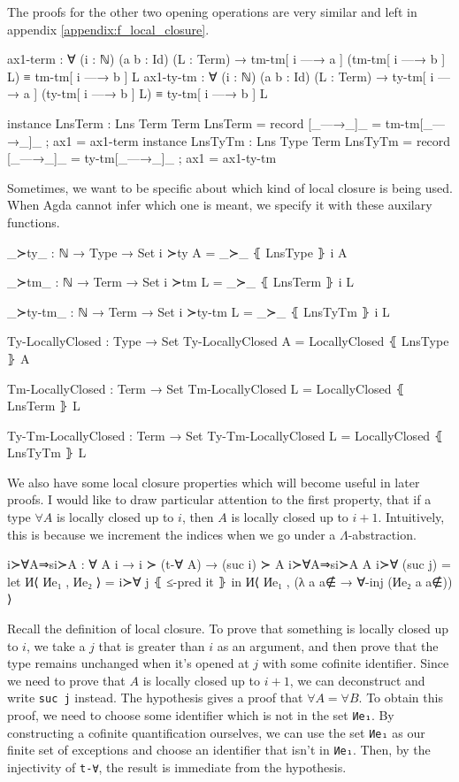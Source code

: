 \documentclass[logo,bsc,singlespacing,parskip,online]{infthesis}
\begin{document}
The proofs for the other two opening operations are very similar and left in appendix \ref{appendix:f_local_closure}.
\begin{code}
  ax1-term : ∀ (i : ℕ) (a b : Id) (L : Term)
    → tm-tm[ i —→ a ] (tm-tm[ i —→ b ] L) ≡ tm-tm[ i —→ b ] L
  ax1-ty-tm : ∀ (i : ℕ) (a b : Id) (L : Term)
    → ty-tm[ i —→ a ] (ty-tm[ i —→ b ] L) ≡ ty-tm[ i —→ b ] L

  instance
    LnsTerm : Lns Term Term
    LnsTerm = record
      { [_—→_]_ = tm-tm[_—→_]_
      ; ax1 = ax1-term }
  instance
    LnsTyTm : Lns Type Term
    LnsTyTm = record
      { [_—→_]_ = ty-tm[_—→_]_
      ; ax1 = ax1-ty-tm }
\end{code}

Sometimes, we want to be specific about which kind of local closure is being used. When Agda cannot
infer which one is meant, we specify it with these auxilary functions.
\begin{code}
  _≻ty_ : ℕ → Type → Set
  i ≻ty A = _≻_ ⦃ LnsType ⦄ i A

  _≻tm_ : ℕ → Term → Set
  i ≻tm L = _≻_ ⦃ LnsTerm ⦄ i L

  _≻ty-tm_ : ℕ → Term → Set
  i ≻ty-tm L = _≻_ ⦃ LnsTyTm ⦄ i L

  Ty-LocallyClosed : Type → Set
  Ty-LocallyClosed A = LocallyClosed ⦃ LnsType ⦄ A

  Tm-LocallyClosed : Term → Set
  Tm-LocallyClosed L = LocallyClosed ⦃ LnsTerm ⦄ L

  Ty-Tm-LocallyClosed : Term → Set
  Ty-Tm-LocallyClosed L = LocallyClosed ⦃ LnsTyTm ⦄ L
\end{code}

We also have some local closure properties which will become useful in later proofs. I would like to
draw particular attention to the first property, that if a type $\forall A$ is locally closed up to
$i$, then $A$ is locally closed up to $i + 1$. Intuitively, this is because we increment the indices
when we go under a $\Lambda$-abstraction.
\begin{code}
  i≻∀A⇒si≻A : ∀ {A i} → i ≻ (t-∀ A) → (suc i) ≻ A
  i≻∀A⇒si≻A {A} i≻∀ (suc j) =
    let И⟨ Иe₁ , Иe₂ ⟩ = i≻∀ j ⦃ ≤-pred it ⦄
    in И⟨ Иe₁ , (λ a {a∉} → ∀-inj (Иe₂ a {a∉})) ⟩
\end{code}

Recall the definition of local closure. To prove that something is locally closed up to $i$, we take
a $j$ that is greater than $i$ as an argument, and then prove that the type remains unchanged when
it's opened at $j$ with some cofinite identifier. Since we need to prove that $A$ is locally closed
up to $i + 1$, we can deconstruct and write \texttt{suc j} instead. The hypothesis gives a proof
that $\forall A = \forall B$. To obtain this proof, we need to choose some identifier which is not
in the set \texttt{Иe₁}. By constructing a cofinite quantification ourselves, we can use the set
\texttt{Иe₁} as our finite set of exceptions and choose an identifier that isn't in \texttt{Иe₁}.
Then, by the injectivity of \texttt{t-∀}, the result is immediate from the hypothesis.
\end{document}
